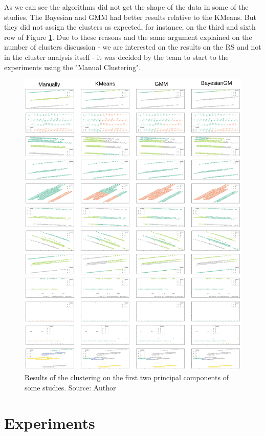 As we can see the algorithms did not get the shape of the data in some of the studies. The Bayesian and GMM had better results relative to the KMeans. But they did not assign the clusters as expected, for instance, on the third and sixth row of Figure \ref{fig:clustering-studies}. Due to these reasons and the same argument explained on the number of clusters discussion - we are interested on the results on the RS and not in the cluster analysis itself - it was decided by the team to start to the experiments using the "Manual Clustering".

\begin{figure}[H]
   \centering
   \includegraphics[width=\linewidth]{fig/ch3-clustering-studies.png}
   \caption{Results of the clustering on the first two principal components of some studies. Source: Author}
   \label{fig:clustering-studies}
\end{figure}

\section{Experiments}

